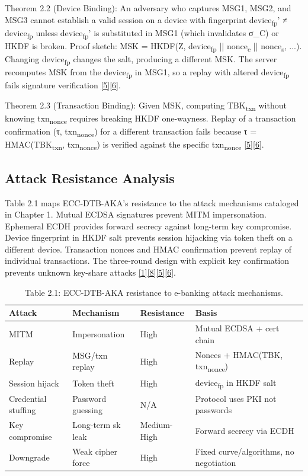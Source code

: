 \indent Theorem 2.2 (Device Binding): An adversary who captures MSG1, MSG2, and MSG3 cannot establish a valid session on a device with fingerprint device\textsubscript{fp}' ≠ device\textsubscript{fp} unless device\textsubscript{fp}' is substituted in MSG1 (which invalidates σ\_C) or HKDF is broken. Proof sketch: MSK = HKDF(Z, device\textsubscript{fp} || nonce\textsubscript{c} || nonce\textsubscript{s}, ...). Changing device\textsubscript{fp} changes the salt, producing a different MSK. The server recomputes MSK from the device\textsubscript{fp} in MSG1, so a replay with altered device\textsubscript{fp} fails signature verification \hyperref[ref:5]{[5]}\hyperref[ref:6]{[6]}.

\indent Theorem 2.3 (Transaction Binding): Given MSK, computing TBK\textsubscript{txn} without knowing txn\textsubscript{nonce} requires breaking HKDF one-wayness. Replay of a transaction confirmation (τ, txn\textsubscript{nonce}) for a different transaction fails because τ = HMAC(TBK\textsubscript{txn}, txn\textsubscript{nonce}) is verified against the specific txn\textsubscript{nonce} \hyperref[ref:5]{[5]}\hyperref[ref:6]{[6]}.

\subsection{Attack Resistance Analysis}

\indent Table 2.1 maps ECC-DTB-AKA's resistance to the attack mechanisms cataloged in Chapter 1. Mutual ECDSA signatures prevent MITM impersonation. Ephemeral ECDH provides forward secrecy against long-term key compromise. Device fingerprint in HKDF salt prevents session hijacking via token theft on a different device. Transaction nonces and HMAC confirmation prevent replay of individual transactions. The three-round design with explicit key confirmation prevents unknown key-share attacks \hyperref[ref:1]{[1]}\hyperref[ref:8]{[8]}\hyperref[ref:5]{[5]}\hyperref[ref:6]{[6]}.

\begin{table}[htbp]
\centering
\begin{tabular}{llll}
\toprule
Attack & Mechanism & Resistance & Basis \\
\midrule
MITM & Impersonation & High & Mutual ECDSA + cert chain \\
Replay & MSG/txn replay & High & Nonces + HMAC(TBK, txn\textsubscript{nonce}) \\
Session hijack & Token theft & High & device\textsubscript{fp} in HKDF salt \\
Credential stuffing & Password guessing & N/A & Protocol uses PKI not passwords \\
Key compromise & Long-term sk leak & Medium-High & Forward secrecy via ECDH \\
Downgrade & Weak cipher force & High & Fixed curve/algorithms, no negotiation \\
\bottomrule
\end{tabular}
\caption{Table 2.1: ECC-DTB-AKA resistance to e-banking attack mechanisms.}\label{tbl:2.1}
\end{table}
